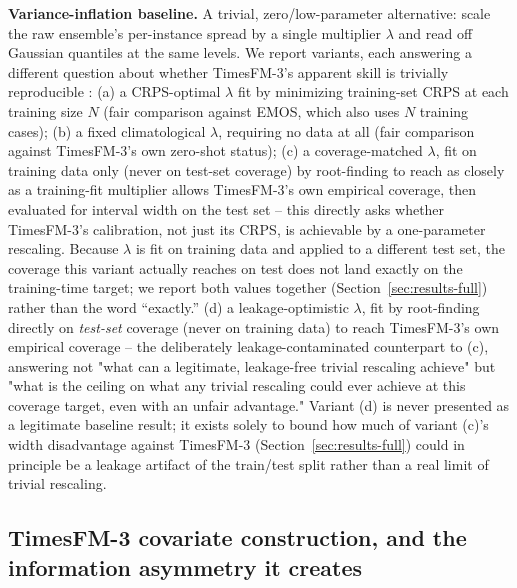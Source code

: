 \textbf{Variance-inflation baseline.} A trivial, zero/low-parameter
alternative: scale the raw ensemble's per-instance spread by a single
multiplier \(\lambda\) and read off Gaussian quantiles at the same
\NQuantileLevels{} levels. We report \NVarianceInflationVariants{} variants,
each answering a different question about whether TimesFM-3's apparent skill
is trivially reproducible \citep{zhang_2025_context_parroting}: (a) a
CRPS-optimal \(\lambda\) fit by minimizing training-set CRPS at each training
size \(N\) (fair comparison against EMOS, which also uses \(N\) training
cases); (b) a fixed climatological \(\lambda\), requiring no data at all
(fair comparison against TimesFM-3's own zero-shot status); (c) a
coverage-matched \(\lambda\), fit on training data only (never on test-set
coverage) by root-finding to reach as closely as a training-fit multiplier
allows TimesFM-3's own empirical coverage, then evaluated for interval
width on the test set -- this directly asks whether TimesFM-3's
calibration, not just its CRPS, is achievable by a one-parameter
rescaling. Because \(\lambda\) is fit on training data and applied to a
different test set, the coverage this variant actually reaches on test
does not land exactly on the training-time target; we report both values
together (Section~\ref{sec:results-full}) rather than the word
``exactly.'' (d) a leakage-optimistic \(\lambda\), fit by root-finding
directly on \emph{test-set} coverage (never on training data) to reach
TimesFM-3's own empirical coverage -- the deliberately
leakage-contaminated counterpart to (c), answering not "what can a
legitimate, leakage-free trivial rescaling achieve" but "what is the
ceiling on what any trivial rescaling could ever achieve at this
coverage target, even with an unfair advantage." Variant (d) is never
presented as a legitimate baseline result; it exists solely to bound how
much of variant (c)'s width disadvantage against TimesFM-3
(Section~\ref{sec:results-full}) could in principle be a leakage
artifact of the train/test split rather than a real limit of trivial
rescaling.

\subsection{TimesFM-3 covariate construction, and the information asymmetry it creates}
\label{sec:covariates}

